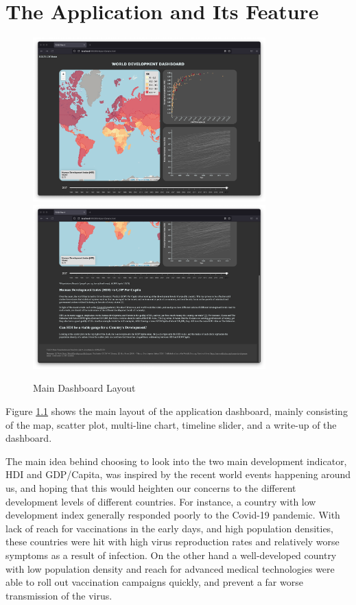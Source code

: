 \documentclass{scrreprt}
\begin{document}
\chapter{The Application and Its Feature}
\begin{figure}[H]
    \centering
    \includegraphics[width = 0.8\textwidth]{images/main.png}
    \includegraphics[width = 0.8\textwidth]{images/main_2.png}
    \label{fig:main}
    \caption{Main Dashboard Layout}
\end{figure}
Figure \ref{fig:main} shows the main layout of the application dashboard, mainly consisting of the map, scatter plot, multi-line chart, timeline slider, and a write-up of the dashboard. 

The main idea behind choosing to look into the two main development indicator, HDI and GDP/Capita, was inspired by the recent world events happening around us, and hoping that this would heighten our concerns to the different development levels of different countries. For instance, a country with low development index generally responded poorly to the Covid-19 pandemic. With lack of reach for vaccinations in the early days, and high population densities, these countries were hit with high virus reproduction rates and relatively worse symptoms as a result of infection. On the other hand a well-developed country with low population density and reach for advanced medical technologies were able to roll out vaccination campaigns quickly, and prevent a far worse transmission of the virus. 
\end{document}
